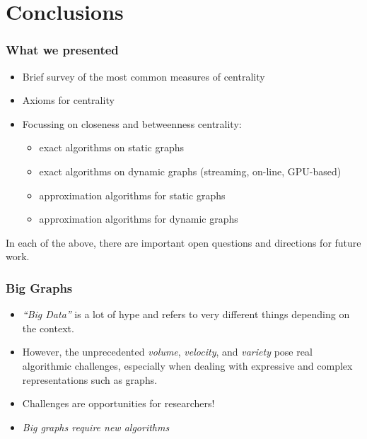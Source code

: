 \section{Conclusions}

\begin{frame}
  \frametitle{What we presented}
  \begin{itemize}
    \pause
    \item Brief survey of the most common measures of centrality
    \item Axioms for centrality
    \item Focussing on closeness and betweenness centrality:
      \begin{itemize}
        \item exact algorithms on static graphs
        \item exact algorithms on dynamic graphs (streaming, on-line, GPU-based)
        \item approximation algorithms for static graphs
        \item approximation algorithms for dynamic graphs
    \end{itemize}
  \end{itemize}
  In each of the above, there are important open questions and directions for
  future work.
\end{frame}

\begin{frame}
  \frametitle{Big Graphs}
  \begin{itemize}
    \pause
    \item \emph{``Big Data''} is a lot of hype and refers to very different
      things depending on the context.
    \pause
    \item However, the unprecedented \emph{volume}, \emph{velocity}, and
      \emph{variety} pose real algorithmic challenges, especially when dealing
      with expressive and complex representations such as graphs.
    \pause
    \item Challenges are opportunities for researchers!
    \pause
    \item \emph{Big graphs require new algorithms}
  \end{itemize}
\end{frame}

